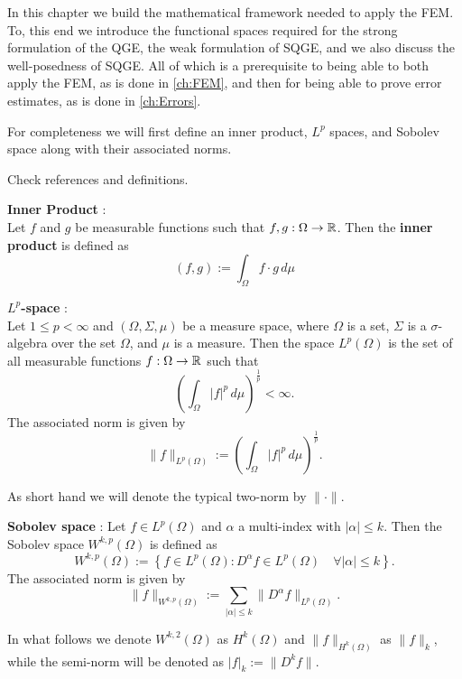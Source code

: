 In this chapter we build the mathematical framework needed to apply the FEM. To,
this end we introduce the functional spaces required for the strong formulation
of the QGE, the weak formulation of SQGE, and we also discuss the well-posedness
of SQGE. All of which is a prerequisite to being able to both apply the FEM, as
is done in \autoref{ch:FEM}, and then for being able to prove error estimates,
as is done in \autoref{ch:Errors}.

For completeness we will first define an inner product, $L^p$ spaces, and
Sobolev space along with their associated norms.

{\color{red} {\LARGE Check references and definitions.}
\begin{definition} \label{def:InnerProduct}
  \textbf{Inner Product} \cite{Royden2010}: \\
  Let $f$ and $g$ be measurable functions such that $f,g : \Omega \rightarrow \mathbb{R}$.
  Then the \textbf{inner product} is defined as
  \begin{equation}
    (f,g) := \int_{\Omega}\! f \cdot g\, d\mu
    \label{eqn:InnerProduct}
  \end{equation}
\end{definition}

\begin{definition} \label{def:LpSpace}
  \textbf{$L^p$-space} \cite{Royden2010}: \\
  Let $1\le p < \infty$ and $(\Omega, \Sigma, \mu)$ be a measure space, where
  $\Omega$ is a set, $\Sigma$ is a $\sigma$-algebra over the set $\Omega$, and
  $\mu$ is a measure. Then the space $L^p(\Omega)$ is the set of all measurable
  functions $f : \Omega \rightarrow \mathbb{R}$ such that
  \begin{equation}
    \left(\int_{\Omega}\! |f|^p\, d\mu\right)^{\frac{1}{p}} < \infty.
    \label{eqn:LP}
  \end{equation}
  The associated norm is given by
  \begin{equation}
    \|f\|_{L^p(\Omega)} := \left(\int_{\Omega}\! |f|^p\, d\mu\right)^{\frac{1}{p}}.
    \label{eqn:LPNorm}
  \end{equation}
\end{definition}
As short hand we will denote the typical two-norm by $\|\cdot\|$.

\begin{definition} \label{SobolevSpace}
  \textbf{Sobolev space} \cite{Ciarlet}:
  Let $f \in L^p(\Omega)$ and $\alpha$ a multi-index with $|\alpha| \le k$. Then
  the Sobolev space $W^{k,p}(\Omega)$ is defined as
  \begin{equation}
    W^{k,p}(\Omega) := \left\{ f\in L^p(\Omega) : D^{\alpha} f \in
      L^p(\Omega)\quad \forall |\alpha| \le k\right\}.
    \label{eqn:Sobolev}
  \end{equation}
  The associated norm is given by
  \begin{equation}
    \|f\|_{W^{k,p}(\Omega)} := \sum_{|\alpha|\le k}
      \|D^{\alpha}f\|_{L^p(\Omega)}.
    \label{eqn:HkpNorm}
  \end{equation}
\end{definition}
In what follows we denote $W^{k,2}(\Omega)$ as $H^k(\Omega)$ and
$\|f\|_{H^k(\Omega)}$ as $\|f\|_k$, while the semi-norm will be denoted
as $|f|_k := \|D^k f\|$.}
